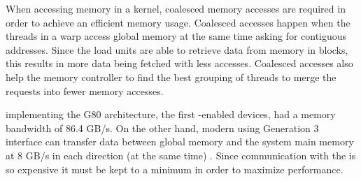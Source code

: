 \documentclass[../thesis]{subfiles}
\begin{document}
	When accessing memory in a \cuda kernel, coalesced memory accesses are required in order to achieve an efficient memory usage. Coalesced accesses happen when the threads in a warp access global memory at the same time asking for contiguous addresses. Since the load units are able to retrieve data from memory in blocks, this results in more data being fetched with less accesses. Coalesced accesses also help the memory controller to find the best grouping of threads to merge the requests into fewer memory accesses.

	\gpus implementing the G80 architecture, the first \cuda-enabled devices, had a memory bandwidth of 86.4 GB/s. On the other hand, modern \gpus using \pcie Generation 3 interface can transfer data between global memory and the system main memory at 8 GB/s in each direction (at the same time) \cite{PMPP:2012}. Since communication with the \cpu is so expensive it must be kept to a minimum in order to maximize performance.
\end{document}
